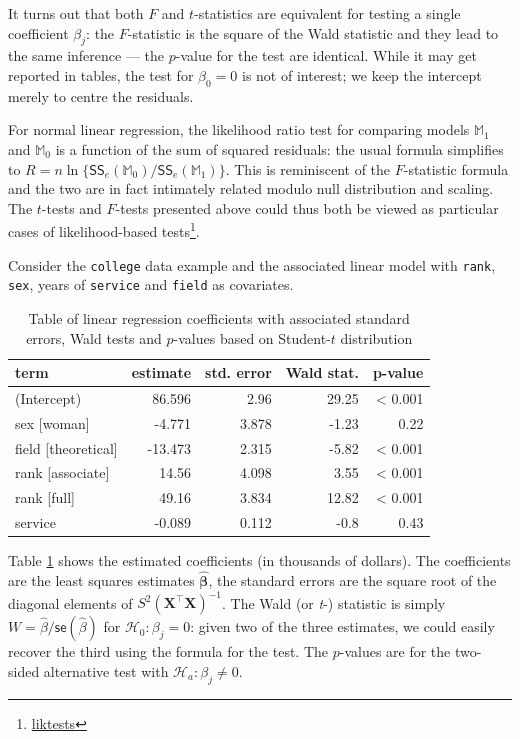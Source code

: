 \documentclass[
  11pt,
  letterpaper,
]{book}
\renewcommand{\href}[2]{#2\footnote{\url{#1}}}
\theoremstyle{definition}
\theoremstyle{definition}
\theoremstyle{definition}
\theoremstyle{definition}
\theoremstyle{remark}
\begin{document}
It turns out that both \(F\) and \(t\)-statistics are equivalent for testing a single coefficient \(\beta_j\): the \(F\)-statistic is the square of the Wald statistic and they lead to the same inference --- the \(p\)-value for the test are identical. While it may get reported in tables, the test for \(\beta_0=0\) is not of interest; we keep the intercept merely to centre the residuals.

For normal linear regression, the likelihood ratio test for comparing models \(\mathbb{M}_1\) and \(\mathbb{M}_0\) is a function of the sum of squared residuals: the usual formula simplifies to \(R = n\ln\{\mathsf{SS}_e(\mathbb{M}_0)/\mathsf{SS}_e(\mathbb{M}_1)\}\). This is reminiscent of the \(F\)-statistic formula and the two are in fact intimately related modulo null distribution and scaling. The \(t\)-tests and \(F\)-tests presented above could thus both be viewed as particular cases of \href{liktests}{likelihood-based tests}.

Consider the \texttt{college} data example and the associated linear model with \texttt{rank}, \texttt{sex}, years of \texttt{service} and \texttt{field} as covariates.

\begin{table}

\caption{\label{tab:summarytestslmcollege}Table of linear regression coefficients with associated standard errors, Wald tests and $p$-values based on Student-$t$ distribution}
\centering
\begin{tabular}[t]{lrrrr}
\toprule
term & estimate & std. error & Wald stat. & p-value\\
\midrule
(Intercept) & 86.596 & 2.96 & 29.25 & < 0.001\\
sex [woman] & -4.771 & 3.878 & -1.23 & 0.22\\
field [theoretical] & -13.473 & 2.315 & -5.82 & < 0.001\\
rank [associate] & 14.56 & 4.098 & 3.55 & < 0.001\\
rank [full] & 49.16 & 3.834 & 12.82 & < 0.001\\
\addlinespace
service & -0.089 & 0.112 & -0.8 & 0.43\\
\bottomrule
\end{tabular}
\end{table}

Table \ref{tab:summarytestslmcollege} shows the estimated coefficients (in thousands of dollars). The coefficients are the least squares estimates \(\widehat{\boldsymbol{\beta}}\), the standard errors are the square root of the diagonal elements of \(S^2(\mathbf{X}^\top\mathbf{X})^{-1}\). The Wald (or \emph{t}-) statistic is simply \(W=\widehat{\beta}/\mathsf{se}(\widehat{\beta})\) for \(\mathscr{H}_0: \beta_j=0\): given two of the three estimates, we could easily recover the third using the formula for the test. The \(p\)-values are for the two-sided alternative test with \(\mathscr{H}_a: \beta_j \neq 0\).
\end{document}
